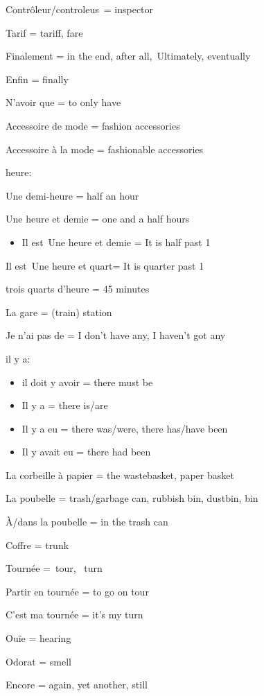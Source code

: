{Contrôleur/controleus~= inspector~}

{Tarif = tariff, fare}

{Finalement = in the end, after all,~}{Ultimately, eventually}

{Enfin = finally~}

{N'avoir que = to only have}

{Accessoire de mode = fashion accessories~}

{Accessoire à la mode = fashionable accessories~}

{heure:}

{Une demi-heure = half an hour~}

Une heure et demie = one and a half hours

\begin{itemize}
\item
  Il est~Une heure et demie = It is half past 1
\end{itemize}

Il est~Une heure et quart= It is quarter past 1

trois quarts d'heure = 45 minutes

La gare = (train) station~

{Je n'ai pas de = I don't have any, I haven't got any~}

{il y a:}

\begin{itemize}
\item
  {il doit y avoir = there must be}
\item
  {Il y a = there is/are}
\item
  Il {y a eu = there was/were, there has/have been}
\item
  {Il y avait eu = there had been}
\end{itemize}

{La corbeille à papier = the wastebasket, paper basket}

{La poubelle = trash/garbage can, rubbish bin, dustbin, bin}

{À/dans la poubelle = in the trash can~}

{Coffre = trunk~}

{Tournée =~}{tour,~ turn}

Partir {en tournée = to go on tour~}

C'est {ma tournée = it's my turn~}

{Ouïe = hearing~}

{Odorat = smell}

{Encore = again, yet another, still}

